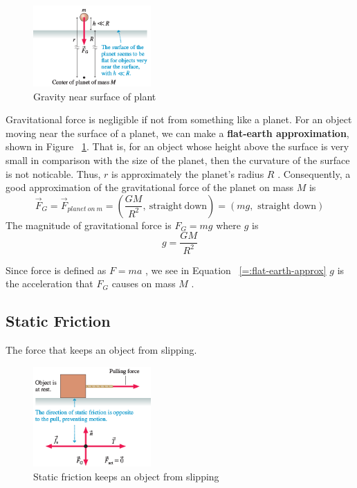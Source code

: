\begin{figure}
    \centering
    \includegraphics[width=0.4\textwidth]{../figures/flat-earth-approx.png}
    \caption{Gravity near surface of plant}%
    \label{fig:flat-earth-approx}
\end{figure}

Gravitational force is negligible if not from something like a planet.
For an object moving near the surface of a planet, we can make a \textbf
{flat-earth approximation}, shown in Figure~%
\ref{fig:flat-earth-approx}.  That is, for an object whose height above
the surface is very small in comparison with the size of the planet,
then the curvature of the surface is not noticable.  Thus,
$
    r
$ is approximately the planet's radius
$
    R
$%
.  Consequently, a good approximation of the gravitational force of the
planet on mass
$
    M
$ is
\begin{equation}
    \vec{F}_G=\vec{F}_{planet~on~m}=\left(\frac{GM}{R^2},\mathrm{~straight~down}\right)=\left
    (mg,\text{~straight~down}\right)%
    \label{=:flat-earth-approx}
\end{equation}
The magnitude of gravitational force is
$
    F_G = mg
$ where
$
    g
$ is
\begin{equation}
    g=\frac{GM}{R^2}
\end{equation}

Since force is defined as
$
    F=ma
$%
, we see in Equation~%
\ref{=:flat-earth-approx}
$
    g
$ is the acceleration that
$
    F_G
$ causes on mass
$
    M
$%
.

\subsection{Static Friction}

\begin{definition}
    The force that keeps an object from slipping.
\end{definition}

\begin{figure}
    \centering
    \includegraphics[width=0.4\textwidth]{../figures/static-friction.png}
    \caption{Static friction keeps an object from slipping}%
    \label{fig:static-friction}
\end{figure}

